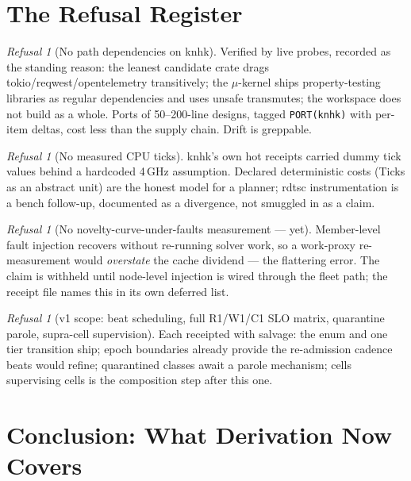 \documentclass[11pt,a4paper]{article}
\theoremstyle{definition}
\theoremstyle{remark}
\newtheorem{refusal}[theorem]{Refusal}
\begin{document}
\section{The Refusal Register}

\begin{refusal}[No path dependencies on knhk]
Verified by live probes, recorded as the standing reason: the leanest
candidate crate drags tokio/reqwest/opentelemetry transitively; the
$\mu$-kernel ships property-testing libraries as regular dependencies and
uses unsafe transmutes; the workspace does not build as a whole. Ports of
50--200-line designs, tagged \texttt{PORT(knhk)} with per-item deltas,
cost less than the supply chain. Drift is greppable.
\end{refusal}

\begin{refusal}[No measured CPU ticks]
knhk's own hot receipts carried dummy tick values behind a hardcoded
4\,GHz assumption. Declared deterministic costs (\textsf{Ticks} as an
abstract unit) are the honest model for a planner; rdtsc instrumentation
is a bench follow-up, documented as a divergence, not smuggled in as a
claim.
\end{refusal}

\begin{refusal}[No novelty-curve-under-faults measurement --- yet]
\label{ref:curve}
Member-level fault injection recovers without re-running solver work, so a
work-proxy re-measurement would \emph{overstate} the cache dividend ---
the flattering error. The claim is withheld until node-level injection is
wired through the fleet path; the receipt file names this in its own
deferred list.
\end{refusal}

\begin{refusal}[v1 scope: beat scheduling, full R1/W1/C1 SLO matrix, quarantine parole, supra-cell supervision]
Each receipted with salvage: the enum and one tier transition ship; epoch
boundaries already provide the re-admission cadence beats would refine;
quarantined classes await a parole mechanism; cells supervising cells is
the composition step after this one.
\end{refusal}

\section{Conclusion: What Derivation Now Covers}
\end{document}
